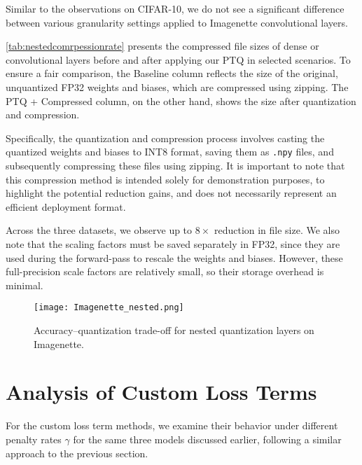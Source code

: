 Similar to the observations on CIFAR-10, we do not see a significant difference between various granularity settings applied to Imagenette convolutional layers.


\cref{tab:nestedcomrpessionrate} presents the compressed file sizes of dense or convolutional layers before and after applying our PTQ in selected scenarios. 
To ensure a fair comparison, the Baseline column reflects the size of the original, unquantized FP32 weights and biases, which are compressed using zipping. 
The PTQ + Compressed column, on the other hand, shows the size after quantization and compression.

Specifically, the quantization and compression process involves casting the quantized weights and biases to
INT8 format, saving them as \texttt{.npy} files, and subsequently compressing these files using zipping. 
It is important to note that this compression method is intended solely for demonstration purposes, 
to highlight the potential reduction gains, and does not necessarily represent an efficient deployment format.

Across the three datasets, we observe up to \( 8 \times \) reduction in file size.
We also note that the scaling factors must be saved separately in FP32, 
since they are used during the forward-pass to rescale the weights and biases. 
However, these full-precision scale factors are relatively small, so their storage overhead is minimal.


\begin{figure}[t!]
  \centering
  \texttt{[image: Imagenette\_nested.png]}
  \caption{Accuracy–quantization trade-off for nested quantization layers on Imagenette.}
  \label{fig:imagenette-nested}
\end{figure}


\newpage

\section{Analysis of Custom Loss Terms}
\label{sec:analysisofcustomlossfunctionterms}

\hspace*{1em}For the custom loss term methods, we examine their behavior under different
penalty rates \( \gamma \) for the same three models discussed earlier, 
following a similar approach to the previous section.

